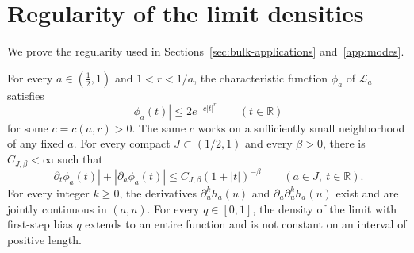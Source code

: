 \section{Regularity of the limit densities}\label{app:regularity}

We prove the regularity used in Sections~\ref{sec:bulk-applications}
and~\ref{app:modes}.

\begin{lemma}\label{lem:analytic-density}
For every $a\in(\frac12,1)$ and $1<r<1/a$, the characteristic function
$\phi_a$ of $\mathcal L_a$ satisfies
\[
 |\phi_a(t)|\le 2e^{-c|t|^r}\qquad(t\in\mathbb R)
\]
for some $c=c(a,r)>0$. The same $c$ works on a sufficiently small
neighborhood of any fixed $a$. For every compact
$J\subset(1/2,1)$ and every $\beta>0$, there is $C_{J,\beta}<\infty$ such that
\[
 |\partial_t\phi_a(t)|+|\partial_a\phi_a(t)|
 \le C_{J,\beta}(1+|t|)^{-\beta}
 \qquad(a\in J,\ t\in\mathbb R).
\]
For every integer $k\ge0$, the derivatives $\partial_u^k h_a(u)$ and
$\partial_a\partial_u^k h_a(u)$ exist and are jointly continuous in $(a,u)$.
For every $q\in[0,1]$, the density of the limit with first-step bias $q$
extends to an entire function and is not constant on an interval of
positive length.
\end{lemma}

